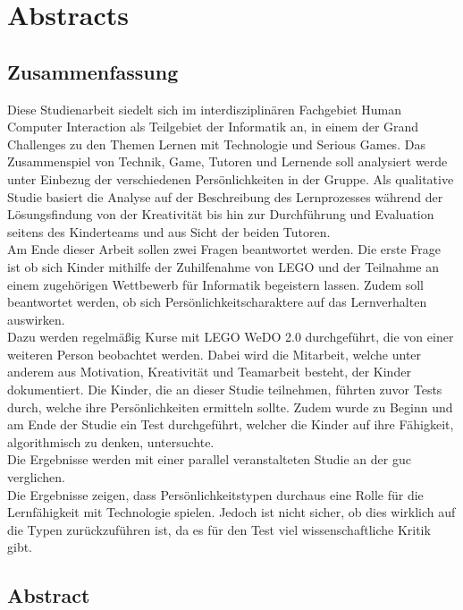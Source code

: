 \setcounter{chapter}{-1}
\chapter{Abstracts}
\section*{Zusammenfassung}

Diese Studienarbeit siedelt sich im interdisziplinären Fachgebiet Human Computer Interaction als Teilgebiet der Informatik an, in einem der Grand Challenges zu den Themen Lernen mit Technologie und Serious Games. Das Zusammenspiel von Technik, Game, Tutoren und Lernende soll analysiert werde unter Einbezug der verschiedenen Persönlichkeiten in der Gruppe. Als qualitative Studie basiert die Analyse auf der Beschreibung des Lernprozesses während der Lösungsfindung von der Kreativität bis hin zur Durchführung und Evaluation seitens des Kinderteams und aus Sicht der beiden Tutoren.\\
Am Ende dieser Arbeit sollen zwei Fragen beantwortet werden. Die erste Frage ist ob sich Kinder mithilfe der Zuhilfenahme von LEGO und der Teilnahme an einem zugehörigen Wettbewerb für Informatik begeistern lassen. Zudem soll beantwortet werden, ob sich Persönlichkeitscharaktere auf das Lernverhalten auswirken.\\
Dazu werden regelmäßig Kurse mit LEGO WeDO 2.0 durchgeführt, die von einer weiteren Person beobachtet werden. Dabei wird die Mitarbeit, welche unter anderem aus Motivation, Kreativität und Teamarbeit besteht, der Kinder dokumentiert. Die Kinder, die an dieser Studie teilnehmen, führten zuvor Tests durch, welche ihre Persönlichkeiten ermitteln sollte. Zudem wurde zu Beginn und am Ende der Studie ein Test durchgeführt, welcher die Kinder auf ihre Fähigkeit, algorithmisch zu denken, untersuchte.\\
Die Ergebnisse werden mit einer parallel veranstalteten Studie an der \acrlong{guc} verglichen.\\
Die Ergebnisse zeigen, dass Persönlichkeitstypen durchaus eine Rolle für die Lernfähigkeit mit Technologie spielen. Jedoch ist nicht sicher, ob dies wirklich auf die Typen zurückzuführen ist, da es für den Test viel wissenschaftliche Kritik gibt.\\

\section*{Abstract}

